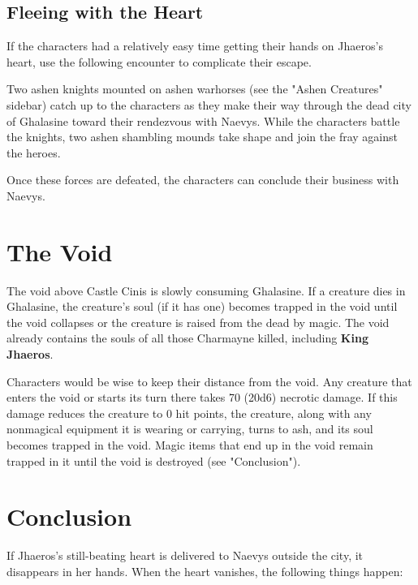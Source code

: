 \documentclass[10pt,a4paper,twoside,bg=print,twocolumn,openany,nodeprecatedcode]{dndbook}
\begin{document}
\subsection{Fleeing with the Heart}
If the characters had a relatively easy time getting their hands on Jhaeros's heart, use the following encounter to complicate their escape.

Two ashen knights mounted on ashen warhorses (see the "Ashen Creatures" sidebar) catch up to the characters as they make their way through the dead city of Ghalasine toward their rendezvous with Naevys. While the characters battle the knights, two ashen shambling mounds take shape and join the fray against the heroes.

Once these forces are defeated, the characters can conclude their business with Naevys.

\section{The Void}
The void above Castle Cinis is slowly consuming Ghalasine. If a creature dies in Ghalasine, the creature's soul (if it has one) becomes trapped in the void until the void collapses or the creature is raised from the dead by magic. The void already contains the souls of all those Charmayne killed, including \textbf{King Jhaeros}.

Characters would be wise to keep their distance from the void. Any creature that enters the void or starts its turn there takes 70 (20d6) necrotic damage. If this damage reduces the creature to 0 hit points, the creature, along with any nonmagical equipment it is wearing or carrying, turns to ash, and its soul becomes trapped in the void. Magic items that end up in the void remain trapped in it until the void is destroyed (see "Conclusion").

\section{Conclusion}
If Jhaeros's still-beating heart is delivered to Naevys outside the city, it disappears in her hands. When the heart vanishes, the following things happen:
\end{document}
